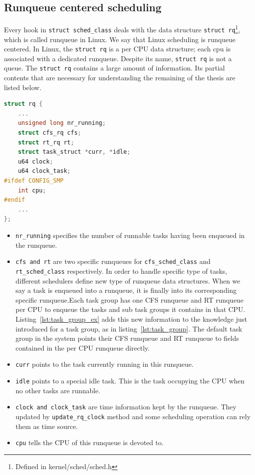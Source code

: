\subsection{Runqueue centered scheduling\label{LinuxSched_rq}}

Every hook in \texttt{struct sched\_class} deals with the data
structure \texttt{struct rq}\footnote{Defined in kernel/sched/sched.h},
which is called runqueue in Linux.  We say that Linux scheduling is
runqueue centered. In Linux, the \texttt{struct rq} is a per CPU data
structure; each cpu is associated with a dedicated runqueue. Despite 
its name, \texttt{struct rq} is not a queue. The \texttt{struct rq} 
contains a large amount of information. Its partial contents that are 
necessary for understanding the remaining of the thesis are listed below.
\begin{lstlisting}[language=C,
			caption={\texttt{The runqueue structure}},
			label={lst:runqueue}]
struct rq {
	...
	unsigned long nr_running;
	struct cfs_rq cfs;
	struct rt_rq rt;
	struct task_struct *curr, *idle;
	u64 clock;
	u64 clock_task;
#ifdef CONFIG_SMP
	int cpu;
#endif
	...
};
\end{lstlisting}
\begin{itemize}
\item \texttt{nr\_running} specifies the number of runnable tasks 
	having been enqueued in the runqueue.
\item \texttt{cfs and rt} are two specific runqueues for 
	\texttt{cfs\_sched\_class} and \texttt{rt\_sched\_class} respectively. 
	In order to handle specific type of tasks, different schedulers define 
	new type of runqueue data structures. 
	When we say a task is enqueued into a runqueue, it is finally into
	its corresponding specific runqueue.Each task group has one CFS 
	runqueue and RT runqueue per CPU to enqueue the tasks and sub task
	groups it contains in that CPU. 
	Listing~\vref{lst:task_group_ex} adds this new information to the
	knowledge just introduced for a task group, as in 
	listing~\vref{lst:task_group}. The default task group in the system points
	their CFS runqueue and RT runqueue to fields contained in the
	per CPU runqueue directly. 
\item \texttt{curr} points to the task currently running in this runqueue.
\item \texttt{idle} points to a special idle task. This is the task occupying
		the CPU  when no other tasks are runnable.
\item \texttt{clock and clock\_task} are time information kept by the runqueue.
	They updated by \texttt{update\_rq\_clock} method and some scheduling
	operation can rely them as time source.
\item \texttt{cpu} tells the CPU of this runqueue is devoted to.
\end{itemize}
